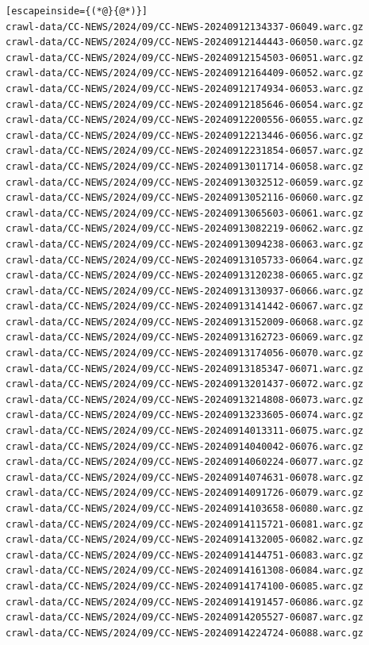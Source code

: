 \begin{lstlisting}[escapeinside={(*@}{@*)}]
crawl-data/CC-NEWS/2024/09/CC-NEWS-20240912134337-06049.warc.gz
crawl-data/CC-NEWS/2024/09/CC-NEWS-20240912144443-06050.warc.gz
crawl-data/CC-NEWS/2024/09/CC-NEWS-20240912154503-06051.warc.gz
crawl-data/CC-NEWS/2024/09/CC-NEWS-20240912164409-06052.warc.gz
crawl-data/CC-NEWS/2024/09/CC-NEWS-20240912174934-06053.warc.gz
crawl-data/CC-NEWS/2024/09/CC-NEWS-20240912185646-06054.warc.gz
crawl-data/CC-NEWS/2024/09/CC-NEWS-20240912200556-06055.warc.gz
crawl-data/CC-NEWS/2024/09/CC-NEWS-20240912213446-06056.warc.gz
crawl-data/CC-NEWS/2024/09/CC-NEWS-20240912231854-06057.warc.gz
crawl-data/CC-NEWS/2024/09/CC-NEWS-20240913011714-06058.warc.gz
crawl-data/CC-NEWS/2024/09/CC-NEWS-20240913032512-06059.warc.gz
crawl-data/CC-NEWS/2024/09/CC-NEWS-20240913052116-06060.warc.gz
crawl-data/CC-NEWS/2024/09/CC-NEWS-20240913065603-06061.warc.gz
crawl-data/CC-NEWS/2024/09/CC-NEWS-20240913082219-06062.warc.gz
crawl-data/CC-NEWS/2024/09/CC-NEWS-20240913094238-06063.warc.gz
crawl-data/CC-NEWS/2024/09/CC-NEWS-20240913105733-06064.warc.gz
crawl-data/CC-NEWS/2024/09/CC-NEWS-20240913120238-06065.warc.gz
crawl-data/CC-NEWS/2024/09/CC-NEWS-20240913130937-06066.warc.gz
crawl-data/CC-NEWS/2024/09/CC-NEWS-20240913141442-06067.warc.gz
crawl-data/CC-NEWS/2024/09/CC-NEWS-20240913152009-06068.warc.gz
crawl-data/CC-NEWS/2024/09/CC-NEWS-20240913162723-06069.warc.gz
crawl-data/CC-NEWS/2024/09/CC-NEWS-20240913174056-06070.warc.gz
crawl-data/CC-NEWS/2024/09/CC-NEWS-20240913185347-06071.warc.gz
crawl-data/CC-NEWS/2024/09/CC-NEWS-20240913201437-06072.warc.gz
crawl-data/CC-NEWS/2024/09/CC-NEWS-20240913214808-06073.warc.gz
crawl-data/CC-NEWS/2024/09/CC-NEWS-20240913233605-06074.warc.gz
crawl-data/CC-NEWS/2024/09/CC-NEWS-20240914013311-06075.warc.gz
crawl-data/CC-NEWS/2024/09/CC-NEWS-20240914040042-06076.warc.gz
crawl-data/CC-NEWS/2024/09/CC-NEWS-20240914060224-06077.warc.gz
crawl-data/CC-NEWS/2024/09/CC-NEWS-20240914074631-06078.warc.gz
crawl-data/CC-NEWS/2024/09/CC-NEWS-20240914091726-06079.warc.gz
crawl-data/CC-NEWS/2024/09/CC-NEWS-20240914103658-06080.warc.gz
crawl-data/CC-NEWS/2024/09/CC-NEWS-20240914115721-06081.warc.gz
crawl-data/CC-NEWS/2024/09/CC-NEWS-20240914132005-06082.warc.gz
crawl-data/CC-NEWS/2024/09/CC-NEWS-20240914144751-06083.warc.gz
crawl-data/CC-NEWS/2024/09/CC-NEWS-20240914161308-06084.warc.gz
crawl-data/CC-NEWS/2024/09/CC-NEWS-20240914174100-06085.warc.gz
crawl-data/CC-NEWS/2024/09/CC-NEWS-20240914191457-06086.warc.gz
crawl-data/CC-NEWS/2024/09/CC-NEWS-20240914205527-06087.warc.gz
crawl-data/CC-NEWS/2024/09/CC-NEWS-20240914224724-06088.warc.gz

\end{lstlisting}
